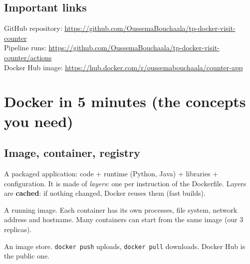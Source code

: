 \documentclass[11pt,a4paper]{article}
\begin{document}
\subsection{Important links}
\begin{note}
GitHub repository: \url{https://github.com/OussemaBouchaala/tp-docker-visit-counter}\\
Pipeline runs: \url{https://github.com/OussemaBouchaala/tp-docker-visit-counter/actions}\\
Docker Hub image: \url{https://hub.docker.com/r/oussemabouchaala/counter-app}
\end{note}

\section{Docker in 5 minutes (the concepts you need)}

\subsection{Image, container, registry}
\begin{center}
\end{center}

\begin{description}[leftmargin=1em,style=nextline]
\item[Image] A packaged application: code + runtime (Python, Java) + libraries + configuration. It is made of \emph{layers}: one per instruction of the Dockerfile. Layers are \textbf{cached}: if nothing changed, Docker reuses them (fast builds).
\item[Container] A running image. Each container has its own processes, file system, network address and hostname. Many containers can start from the same image (our 3 replicas).
\item[Registry] An image store. \texttt{docker push} uploads, \texttt{docker pull} downloads. Docker Hub is the public one.
\end{description}
\end{document}
